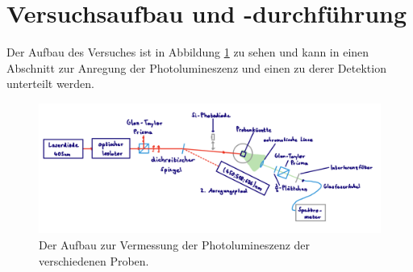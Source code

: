 \newpage
\section{Versuchsaufbau und -durchführung}
        Der Aufbau des Versuches ist in Abbildung \ref{fig:Aufbau} zu sehen und kann in einen Abschnitt zur Anregung der Photolumineszenz und einen zu derer Detektion unterteilt werden. 
        \begin{figure}[h]
          \centering
          \includegraphics[width = 1\textwidth]{pictures/PL_Aufbau.png}
          \caption{Der Aufbau zur Vermessung der Photolumineszenz der verschiedenen Proben.}
          \label{fig:Aufbau}
        \end{figure}

